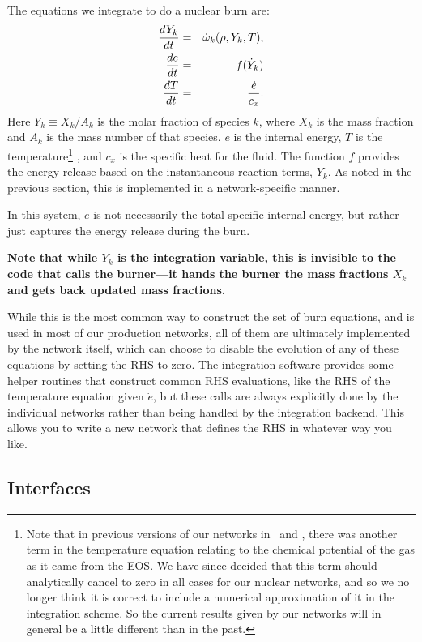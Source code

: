 The equations we integrate to do a nuclear burn are:
\begin{eqnarray}
  \frac{dY_k}{dt} &=& \dot\omega_k(\rho,Y_k,T), \label{eq:spec_integrate} \\
  \frac{de}{dt} &=& f(\dot{Y}_k) \label{eq:enuc_integrate} \\
  \frac{dT}{dt} &=&\frac{\dot{e}}{c_x}. \label{eq:temp_integrate}
\end{eqnarray}
Here $Y_k \equiv X_k / A_k$ is the molar fraction of species $k$, where
$X_k$ is the mass fraction and $A_k$ is the mass number of that species.
$e$ is the internal energy, $T$ is the temperature\footnote{Note that in
previous versions of our networks in \castro\ and \maestro,
there was another term in the temperature equation relating to the
chemical potential of the gas as it came from the EOS. We have since
decided that this term should analytically cancel to zero in all cases
for our nuclear networks, and so we no longer think it is correct to
include a numerical approximation of it in the integration scheme. So
the current results given by our networks will in general be a little
different than in the past.}
, and $c_x$ is the specific heat for the fluid. The function $f$ provides
the energy release based on the instantaneous reaction terms, $\dot{Y}_k$.
As noted in the previous section, this is implemented in a network-specific
manner.

In this system, $e$ is not necessarily the total specific internal energy,
but rather just captures the energy release during the burn.

{\bf Note that while $Y_k$ is the integration variable, this is invisible to
the code that calls the burner---it hands the burner the mass fractions $X_k$
and gets back updated mass fractions.}


While this is the most common way to construct the set of
burn equations, and is used in most of our production networks,
all of them are ultimately implemented by the network itself, which
can choose to disable the evolution of any of these equations by
setting the RHS to zero. The integration software provides some
helper routines that construct common RHS evaluations, like the RHS
of the temperature equation given $\dot{e}$, but these calls
are always explicitly done by the individual networks rather than
being handled by the integration backend. This allows you to write a
new network that defines the RHS in whatever way you like.


\subsection{Interfaces}

